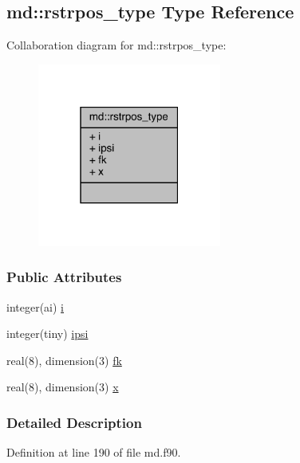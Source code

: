 \hypertarget{structmd_1_1rstrpos__type}{\subsection{md\-:\-:rstrpos\-\_\-type Type Reference}
\label{structmd_1_1rstrpos__type}
}


Collaboration diagram for md\-:\-:rstrpos\-\_\-type\-:
\nopagebreak
\begin{figure}[H]
\begin{center}
\leavevmode
\includegraphics[width=171pt]{structmd_1_1rstrpos__type__coll__graph}
\end{center}
\end{figure}
\subsubsection*{Public Attributes}
\begin{DoxyCompactItemize}
\item 
integer(ai) \hyperlink{structmd_1_1rstrpos__type_aaf42203273f6f02bd4d479b7da4b9b85}{i}
\item 
integer(tiny) \hyperlink{structmd_1_1rstrpos__type_abf1d42acab9fbbcf48edd886adf98d70}{ipsi}
\item 
real(8), dimension(3) \hyperlink{structmd_1_1rstrpos__type_a1072a6523dc5b4c744ae6e10d9a43e06}{fk}
\item 
real(8), dimension(3) \hyperlink{structmd_1_1rstrpos__type_add7f3d833aa2d66c2428451d057bfeda}{x}
\end{DoxyCompactItemize}


\subsubsection{Detailed Description}


Definition at line 190 of file md.\-f90.



